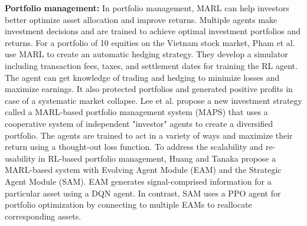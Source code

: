 \documentclass[acmsmall]{acmart}
\begin{document}
\textbf{Portfolio management:} 
In portfolio management, MARL can help investors better optimize asset allocation and improve returns. Multiple agents make investment decisions and are trained to achieve optimal investment portfolios and returns.
For a portfolio of 10 equities on the Vietnam stock market, Pham et al. \cite{Pham2021} use MARL to create an automatic hedging strategy. They develop a simulator including transaction fees, taxes, and settlement dates for training the RL agent. The agent can get knowledge of trading and hedging to minimize losses and maximize earnings. It also protected portfolios and generated positive profits in case of a systematic market collapse.
Lee et al. \cite{lee2020maps} propose a new investment strategy called a MARL-based portfolio management system (MAPS) that uses a cooperative system of independent "investor" agents to create a diversified portfolio. The agents are trained to act in a variety of ways and maximize their return using a thought-out loss function. %
To address the scalability and re-usability in RL-based portfolio management, Huang and Tanaka \cite{huang2022mspm} propose a MARL-based system with Evolving Agent Module (EAM) and the Strategic Agent Module (SAM). EAM generates signal-comprised information for a particular asset using a DQN agent. In contrast, SAM uses a PPO agent for portfolio optimization by connecting to multiple EAMs to reallocate corresponding assets. %
\end{document}
